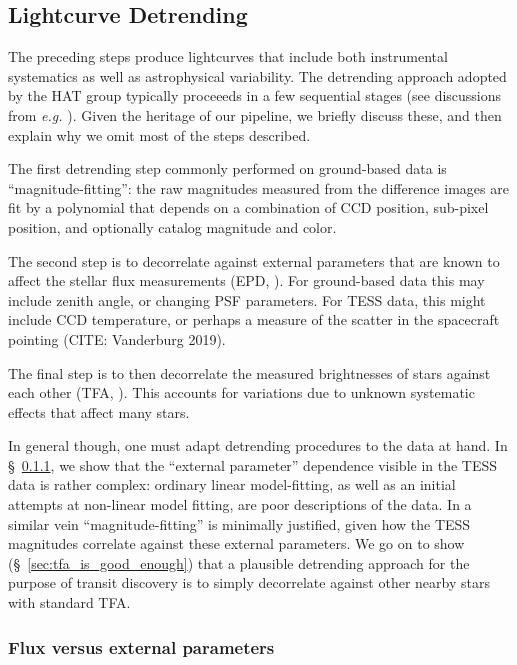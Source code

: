 \documentclass[12pt,twocolumn,tighten]{aastex62}
\begin{document}
\subsection{Lightcurve Detrending}
\label{subsec:lcdetrending}

The preceding steps produce lightcurves that include both instrumental
systematics as well as astrophysical variability.  The detrending
approach adopted by the HAT group typically proceeeds in a few
sequential stages (see discussions from {\it e.g.}
\citealt{bakos_2010,huang_high-precision_2015,zhang_precision_2016}).
Given the heritage of our pipeline, we briefly discuss these, and then
explain why we omit most of the steps described.

The first detrending step commonly performed on ground-based data is
``magnitude-fitting'': the raw magnitudes measured from the difference
images are fit by a polynomial that depends on a combination of CCD
position, sub-pixel position, and optionally catalog magnitude and
color.

The second step is to decorrelate against external parameters that are
known to affect the stellar flux measurements (EPD,
\citealt{bakos_2010}).  For ground-based data this may include zenith
angle, or changing PSF parameters.  For TESS data, this might include
CCD temperature, or perhaps a measure of the scatter in the spacecraft
pointing (CITE: Vanderburg 2019).

The final step is to then decorrelate the measured brightnesses of
stars against each other (TFA, \citealt{kovacs_trend_2005}).  
This accounts for variations due to unknown systematic effects that
affect many stars.


In general though, one must adapt detrending procedures to the data at
hand.  In \S~\ref{sec:flux_vs_external_parameters}, we show that the
``external parameter'' dependence visible in the TESS data is rather
complex: ordinary linear model-fitting, as well as an initial attempts
at non-linear model fitting, are poor descriptions of the data.  
In a similar vein ``magnitude-fitting'' is minimally justified, given
how the TESS magnitudes correlate against these external parameters.
We go on to show (\S~\ref{sec:tfa_is_good_enough}) that a plausible
detrending approach for the purpose of transit discovery is to simply
decorrelate against other nearby stars with standard TFA.


\subsubsection{Flux versus external parameters}
\label{sec:flux_vs_external_parameters}
\end{document}
